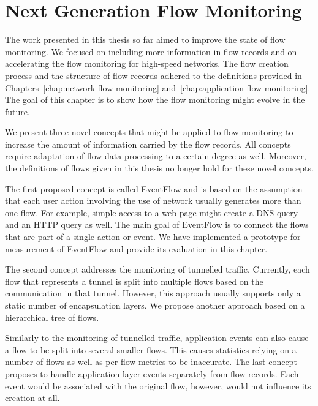 \chapter{Next Generation Flow Monitoring}\label{chap:next-generation-flow}

\begin{chapintro}

The work presented in this thesis so far aimed to improve the state of flow monitoring. We focused on including more information in flow records and on accelerating the flow monitoring for high-speed networks. The flow creation process and the structure of flow records adhered to the definitions provided in Chapters~\ref{chap:network-flow-monitoring} and~\ref{chap:application-flow-monitoring}. The goal of this chapter is to show how the flow monitoring might evolve in the future.

We present three novel concepts that might be applied to flow monitoring to increase the amount of information carried by the flow records. All concepts require adaptation of flow data processing to a certain degree as well. Moreover, the definitions of flows given in this thesis no longer hold for these novel concepts.

The first proposed concept is called EventFlow and is based on the assumption that each user action involving the use of network usually generates more than one flow. For example, simple access to a web page might create a DNS query and an HTTP query as well. The main goal of EventFlow is to connect the flows that are part of a single action or event. We have implemented a prototype for measurement of EventFlow and provide its evaluation in this chapter.

The second concept addresses the monitoring of tunnelled traffic. Currently, each flow that represents a tunnel is split into multiple flows based on the communication in that tunnel. However, this approach usually supports only a static number of encapsulation layers. We propose another approach based on a hierarchical tree of flows.

Similarly to the monitoring of tunnelled traffic, application events can also cause a flow to be split into several smaller flows. This causes statistics relying on a number of flows as well as per-flow metrics to be inaccurate. The last concept proposes to handle application layer events separately from flow records. Each event would be associated with the original flow, however, would not influence its creation at all.


\end{chapintro}
